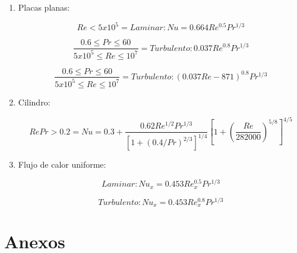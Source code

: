 \documentclass[12pt,letterpaper]{article}     %
\begin{document}
\begin{enumerate}
    \item Placas planas: 
    
\begin{equation}
 Re < 5x10^{5} = Laminar: Nu = 0.664Re^{0.5}Pr^{1/3}
    \label{eq:p.planaslaminar}
\end{equation}

\begin{equation}
 \frac{0.6 \leq Pr \leq 60}{5x10^{5} \leq Re \leq 10^{7}} = Turbulento: 0.037Re^{0.8}Pr^{1/3}
 \label{eq:p.planasturbulento}
\end{equation}

\begin{equation}
\frac{0.6 \leq Pr \leq 60}{5x10^{5} \leq Re \leq 10^{7}} = Turbulento: (0.037Re - 871)^{0.8}Pr^{1/3}
    \label{eq:p.planascombinado}
\end{equation}

\item Cilindro:

\begin{equation}
Re Pr > 0.2 = Nu = 0.3 + \frac{0.62Re^{1/2}Pr^{1/3}}{[1 + (0.4/Pr)^{2/3}]^{1/4}}[1 + (\frac{Re}{282000})^{5/8}]^{4/5}
    \label{eq:p.cilindro}
\end{equation}

\item Flujo de calor uniforme:

\begin{equation}
Laminar: Nu_{x} = 0.453Re_{x}^{0.5}Pr^{1/3}
    \label{eq:p.flujoconst.laminar}
\end{equation}

\begin{equation}
Turbulento: Nu_{x} = 0.453Re_{x}^{0.8}Pr^{1/3}
    \label{eq:p.flujoconst.turbulento}
\end{equation}




    
    
    
\end{enumerate}









\newpage
\section{Anexos}
\end{document}
